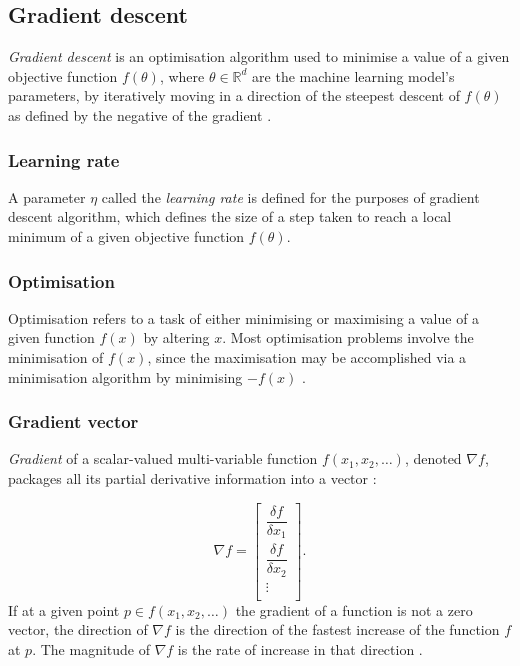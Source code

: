 \subsection{Gradient descent}
\label{gradientdescent}

\emph{Gradient descent} is an optimisation algorithm used to minimise a value of a given objective function $f(\theta)$, where $\theta \in \mathbb{R}^d$ are the machine learning model's parameters, by iteratively moving in a direction of the steepest descent of $f(\theta)$ as defined by the negative of the gradient \cite{gradient_descent_cheatsheet}. 

\subsubsection{Learning rate}

A parameter $\eta$ called the \emph{learning rate} is defined for the purposes of gradient descent algorithm, which defines the size of a step taken to reach a local minimum of a given objective function $f(\theta)$. 

\subsubsection{Optimisation}

Optimisation refers to a task of either minimising or maximising a value of a given function $f(x)$ by altering $x$. Most optimisation problems involve the minimisation of $f(x)$, since the maximisation may be accomplished via a minimisation algorithm by minimising $-f(x)$ \cite{goodfellow}.

\subsubsection{Gradient vector}

\emph{Gradient} of a scalar-valued multi-variable function $f(x_1, x_2, \dots)$, denoted $\nabla f$, packages all its partial derivative information into a vector \cite{gradient_khan}:

\begin{equation}
\nabla f = \begin{bmatrix}
\dfrac{\delta f}{\delta x_1} \\[3ex]
\dfrac{\delta f}{\delta x_2} \\[3ex]
 \vdots\\[1ex]
\end{bmatrix}.
\end{equation}
If at a given point $p \in f(x_1, x_2, \dots)$ the gradient of a function is not a zero vector, the direction of $\nabla f$  is the direction of the fastest increase of the function $f$ at $p$. The magnitude of $\nabla f$ is the rate of increase in that direction \cite{gradient_calculus, wiki:gradient}.

